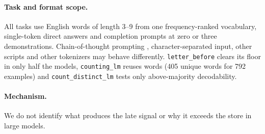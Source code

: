 \paragraph{Task and format scope.}
All tasks use English words of length 3--9 from one frequency-ranked vocabulary, single-token direct
answers and completion prompts at zero or three demonstrations. Chain-of-thought prompting
\citep{wei2022cot,kojima2022zeroshot}, character-separated
input, other scripts and other tokenizers may behave differently. \texttt{letter\_before} clears its
floor in only half the models, \texttt{counting\_lm} reuses words (405 unique words for 792 examples)
and \texttt{count\_distinct\_lm} tests only above-majority decodability.

\paragraph{Mechanism.}
We do not identify what produces the late signal or why it exceeds the store in large models.
